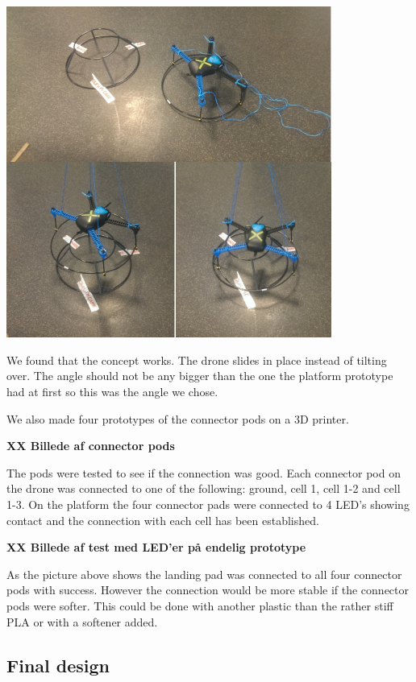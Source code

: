 \begin{center}
	\includegraphics[width=0.8\textwidth]{imgs/prototype1_test}
\end{center}

We found that the concept works. The drone slides in place instead of tilting over. The angle should not be any bigger than the one the platform prototype had at first so this was the angle we chose.

We also made four prototypes of the connector pods on a 3D printer.

\Huge{\textbf{XX Billede af connector pods}}

\normalsize
The pods were tested to see if the connection was good. Each connector pod on the drone was connected to one of the following: ground, cell 1, cell 1-2 and cell 1-3. On the platform the four connector pads were connected to 4 LED's showing contact and the connection with each cell has been established.

\Huge{\textbf{XX Billede af test med LED'er på endelig prototype}}

\normalsize
As the picture above shows the landing pad was connected to all four connector pods with success. However the connection would be more stable if the connector pods were softer. This could be done with another plastic than the rather stiff PLA or with a softener added.
\subsection{Final design}

